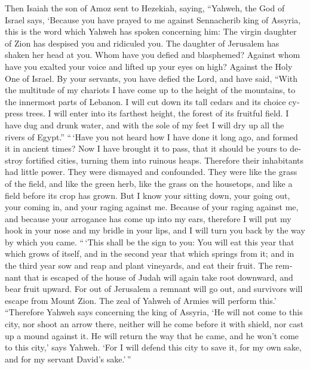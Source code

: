 \begin{paracol}{2}
\begin{otherlanguage}{english}
 Then Isaiah the son of Amoz sent to Hezekiah, saying,
``Yahweh, the God of Israel says, `Because you have prayed to me against
Sennacherib king of Assyria,  this is the word which
Yahweh has spoken concerning him: The virgin daughter of Zion has
despised you and ridiculed you. The daughter of Jerusalem has shaken her
head at you.  Whom have you defied and blasphemed?
Against whom have you exalted your voice and lifted up your eyes on
high? Against the Holy One of Israel.  By your servants,
you have defied the Lord, and have said, ``With the multitude of my
chariots I have come up to the height of the mountains, to the innermost
parts of Lebanon. I will cut down its tall cedars and its choice cypress
trees. I will enter into its farthest height, the forest of its fruitful
field.  I have dug and drunk water, and with the sole of
my feet I will dry up all the rivers of Egypt.'' 
``\,`Have you not heard how I have done it long ago, and formed it in
ancient times? Now I have brought it to pass, that it should be yours to
destroy fortified cities, turning them into ruinous heaps.
 Therefore their inhabitants had little power. They were
dismayed and confounded. They were like the grass of the field, and like
the green herb, like the grass on the housetops, and like a field before
its crop has grown.  But I know your sitting down, your
going out, your coming in, and your raging against me. 
Because of your raging against me, and because your arrogance has come
up into my ears, therefore I will put my hook in your nose and my bridle
in your lips, and I will turn you back by the way by which you came.
 ``\,`This shall be the sign to you: You will eat this
year that which grows of itself, and in the second year that which
springs from it; and in the third year sow and reap and plant vineyards,
and eat their fruit.  The remnant that is escaped of the
house of Judah will again take root downward, and bear fruit upward.
 For out of Jerusalem a remnant will go out, and
survivors will escape from Mount Zion. The zeal of Yahweh of Armies will
perform this.'  ``Therefore Yahweh says concerning the
king of Assyria, `He will not come to this city, nor shoot an arrow
there, neither will he come before it with shield, nor cast up a mound
against it.  He will return the way that he came, and he
won't come to this city,' says Yahweh.  `For I will
defend this city to save it, for my own sake, and for my servant David's
sake.'\,''


\end{otherlanguage}
\end{paracol}
